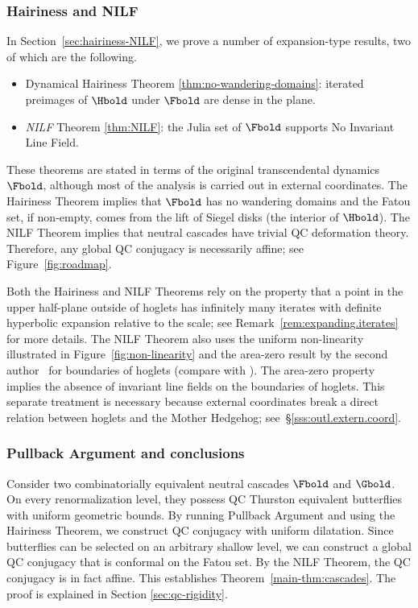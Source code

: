 \documentclass{amsart}
\begin{document}
\subsubsection{Hairiness and NILF}\label{sss:outl.NIFL} In Section~\ref{sec:hairiness-NILF}, we prove a number of expansion-type results, two of which are the following.
\begin{itemize}
    \item Dynamical Hairiness Theorem \ref{thm:no-wandering-domains}: iterated preimages of $\Hbold$ under $\Fbold$ are dense in the plane.
    \item \emph{NILF} Theorem \ref{thm:NILF}: the Julia set of $\Fbold$ supports No Invariant Line Field.
\end{itemize}
These theorems are stated in terms of the original transcendental dynamics $\Fbold$, although most of the analysis is carried out in external coordinates. The Hairiness Theorem implies that $\Fbold$ has no wandering domains and the Fatou set, if non-empty, comes from the lift of Siegel disks (the interior of $\Hbold$). The NILF Theorem implies that neutral cascades have trivial QC deformation theory. Therefore, any global QC conjugacy is necessarily affine; see Figure~\ref{fig:roadmap}.

Both the Hairiness and NILF Theorems rely on the property that a point in the upper half-plane outside of hoglets has infinitely many iterates with definite hyperbolic expansion relative to the scale; see Remark~\ref{rem:expanding.iterates} for more details. The NILF Theorem also uses the uniform non-linearity illustrated in Figure~\ref{fig:non-linearity} and the area-zero result by the second author~\cite{Lim26b} for boundaries of hoglets (compare with \cite{Che13,Che19}). 
The area-zero property implies the absence of invariant line fields on the boundaries of hoglets. This separate treatment is necessary because external coordinates break a direct relation between hoglets and the Mother Hedgehog; see~\S\ref{sss:outl.extern.coord}.

\subsubsection{Pullback Argument and conclusions}\label{sss:outl.PA} Consider two combinatorially equivalent neutral cascades $\Fbold$ and $\Gbold$. On every renormalization level, they possess QC Thurston equivalent butterflies with uniform geometric bounds. By running Pullback Argument and using the Hairiness Theorem, we construct QC conjugacy with uniform dilatation. Since butterflies can be selected on an arbitrary shallow level, we can construct a global QC conjugacy that is conformal on the Fatou set. 
By the NILF Theorem, the QC conjugacy is in fact affine. This establishes Theorem~\ref{main-thm:cascades}. The proof is explained in Section \ref{sec:qc-rigidity}.
\end{document}
